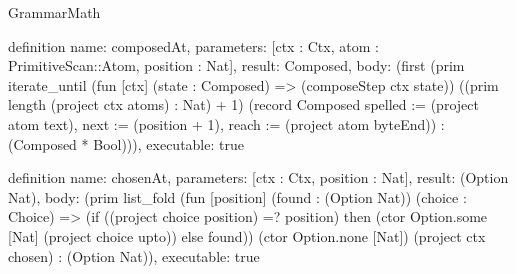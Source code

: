 \begin{lexlean}{GrammarMath}
\begin{semanticmodule}
{{{definition{
  name: composedAt,
  parameters: [ctx : Ctx, atom : PrimitiveScan::Atom, position : Nat],
  result: Composed,
  body: (first (prim iterate_until (fun [ctx] (state : Composed) => (composeStep ctx state)) ((prim length (project ctx atoms) : Nat) + 1) (record Composed {spelled := (project atom text), next := (position + 1), reach := (project atom byteEnd)}) : (Composed * Bool))),
  executable: true
}

definition{
  name: chosenAt,
  parameters: [ctx : Ctx, position : Nat],
  result: (Option Nat),
  body: (prim list_fold (fun [position] (found : (Option Nat)) (choice : Choice) => (if ((project choice position) =? position) then (ctor Option.some [Nat] (project choice upto)) else found)) (ctor Option.none [Nat]) (project ctx chosen) : (Option Nat)),
  executable: true
}

}}}
\end{semanticmodule}
\end{lexlean}
